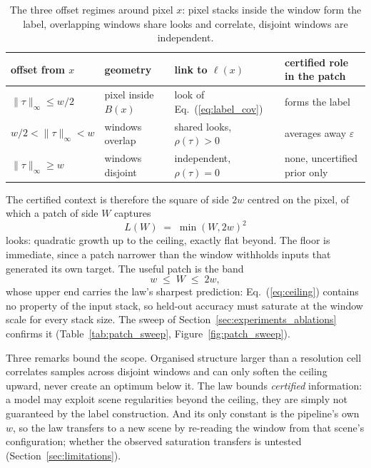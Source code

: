 \begin{table}[H]
  \centering
  \caption{The three offset regimes around pixel $x$: pixel stacks inside the window form the label, overlapping windows share looks and correlate, disjoint windows are independent.}
  \label{tab:context_regimes}
  \begin{tabular}{@{}llll@{}}
    \toprule
    offset from $x$ & geometry & link to $\ell(x)$ & certified role in the patch \\
    \midrule
    $\lVert\tau\rVert_\infty \le w/2$      & pixel inside $B(x)$ & look of Eq.~(\ref{eq:label_cov})  & forms the label \\
    $w/2 < \lVert\tau\rVert_\infty < w$    & windows overlap     & shared looks, $\rho(\tau) > 0$    & averages away $\varepsilon$ \\
    $\lVert\tau\rVert_\infty \ge w$        & windows disjoint    & independent, $\rho(\tau) = 0$     & none, uncertified prior only \\
    \bottomrule
  \end{tabular}
\end{table}

The certified context is therefore the square of side $2w$ centred on the pixel, of which a patch of side $W$ captures
\begin{equation}
  L(W) \;=\; \min(W, 2w)^2
  \label{eq:ceiling}
\end{equation}
looks: quadratic growth up to the ceiling, exactly flat beyond. The floor is immediate, since a patch narrower than the window withholds inputs that generated its own target. The useful patch is the band
\begin{equation}
  w \;\le\; W \;\le\; 2w,
  \label{eq:band}
\end{equation}
whose upper end carries the law's sharpest prediction: Eq.~(\ref{eq:ceiling}) contains no property of the input stack, so held-out accuracy must saturate at the window scale for every stack size. The sweep of Section~\ref{sec:experiments_ablations} confirms it (Table~\ref{tab:patch_sweep}, Figure~\ref{fig:patch_sweep}).

Three remarks bound the scope. Organised structure larger than a resolution cell correlates samples across disjoint windows and can only soften the ceiling upward, never create an optimum below it. The law bounds \emph{certified} information: a model may exploit scene regularities beyond the ceiling, they are simply not guaranteed by the label construction. And its only constant is the pipeline's own $w$, so the law transfers to a new scene by re-reading the window from that scene's configuration; whether the observed saturation transfers is untested (Section~\ref{sec:limitations}).
